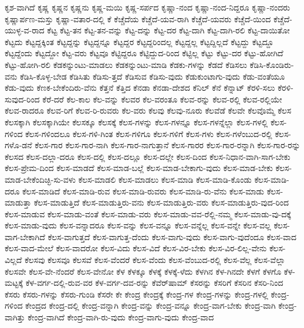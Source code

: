 {ಕೃಶ-ವಾಗಿದೆ
ಕೃಷ್ಣ
ಕೃಷ್ಣನ
ಕೃಷ್ಣನು
ಕೃಷ್ಣ-ಮಯಿ
ಕೃಷ್ಣ-ಸರ್ಪದ
ಕೃಷ್ಣಾ-ನಂದ
ಕೃಷ್ಣಾ-ನಂದ-ನಿದ್ದರೂ
ಕೃಷ್ಣಾ-ನಂದರು
ಕೃಷ್ಣಾರ್ಪಣ-ಮಸ್ತು
ಕೃಷ್ಣಾ-ವತಾರ-ದಲ್ಲಿ
ಕೆ
ಕೆಚ್ಚೆದೆಯ
ಕೆಚ್ಚೆದೆ-ಯವ-ರಾಗಿ
ಕೆಚ್ಚೆದೆ-ಯವರು
ಕೆಚ್ಚೆದೆ-ಯಿಂದ
ಕೆಚ್ಚೆದೆ-ಯುಳ್ಳ-ವ-ರಾದ
ಕೆಟ್ಟ
ಕೆಟ್ಟ-ತನ
ಕೆಟ್ಟ-ತನ-ವನ್ನು
ಕೆಟ್ಟ-ದನ್ನು
ಕೆಟ್ಟ-ದರ
ಕೆಟ್ಟ-ದಾಗಿ
ಕೆಟ್ಟ-ದಾಗಿ-ರಲಿ
ಕೆಟ್ಟ-ದಾಯಿತೋ
ಕೆಟ್ಟದು
ಕೆಟ್ಟದ್ದಕ್ಕಿಂತ
ಕೆಟ್ಟದ್ದನ್ನು
ಕೆಟ್ಟದ್ದನ್ನೂ
ಕೆಟ್ಟದ್ದರ
ಕೆಟ್ಟದ್ದರಿಂದಲ್ಲ
ಕೆಟ್ಟದ್ದಲ್ಲ
ಕೆಟ್ಟದ್ದಿಲ್ಲದೆ
ಕೆಟ್ಟದ್ದು
ಕೆಟ್ಟದ್ದೂ
ಕೆಟ್ಟದ್ದೆಂದು
ಕೆಟ್ಟದ್ದೋ
ಕೆಟ್ಟ-ವರು
ಕೆಟ್ಟವೂ
ಕೆಟ್ಟಿದ್ದರೂ
ಕೆಟ್ಟಿದ್ದುದ-ರಿಂದ
ಕೆಟ್ಟಿಲ್ಲ
ಕೆಟ್ಟು
ಕೆಟ್ಟು-ದರ
ಕೆಟ್ಟು-ಹೋಗಿದೆ
ಕೆಟ್ಟು-ಹೋಗಿ-ರಲಿ
ಕೆಡಕನ್ನುಂಟು-ಮಾಡಲು
ಕೆಡಕನ್ನುಂಟು-ಮಾಡಿ
ಕೆಡಕು-ಗಳನ್ನು
ಕೆಡದೆ
ಕೆಡಿಸಲು
ಕೆಡಿಸಿ-ಕೊಂಡಿರು-ವನು
ಕೆಡಿಸಿ-ಕೊಳ್ಳ-ಬೇಡ
ಕೆಡಿಸಿತು
ಕೆಡಿಸು-ತ್ತದೆ
ಕೆಡಿಸುವ
ಕೆಡಿಸು-ವುದು
ಕೆಡುಕುಂಟಾಗು-ವುದು
ಕೆಡು-ವಂತೆಯೂ
ಕೆಡು-ವುದು
ಕೆಣಕ-ಬೇಕೆಂದಿರು-ವೆನು
ಕೆತ್ತನೆ
ಕೆತ್ತಿದ
ಕೆನಡಾ
ಕೆನಡಾ-ದೇಶದ
ಕೆನಿಲ್
ಕೆನೆ
ಕೆನ್ನಾಟ್
ಕೆರಳಿ-ಸಲು
ಕೆರಳಿ-ಸುವುದ-ರಿಂದ
ಕೆರೆ-ದರೆ
ಕೆಲ-ಕಾಲ
ಕೆಲ-ವನ್ನು
ಕೆಲವರ
ಕೆಲ-ವರಂತೂ
ಕೆಲವ-ರನ್ನು
ಕೆಲವ-ರಲ್ಲಿ
ಕೆಲವ-ರಲ್ಲಿಯೇ
ಕೆಲವ-ರಾದರೂ
ಕೆಲವ-ರಿಗೆ
ಕೆಲವ-ರಿ-ರುವರು
ಕೆಲ-ವರು
ಕೆಲವು
ಕೆಲವು-ನೂರು
ಕೆಲವೆಡೆ
ಕೆಲವೇ
ಕೆಲವೊಮ್ಮೆ
ಕೆಲಸ
ಕೆಲಸಕ್ಕಾಗಿ
ಕೆಲಸಕ್ಕಾಗಿಯೇ
ಕೆಲಸಕ್ಕೂ
ಕೆಲಸಕ್ಕೆ
ಕೆಲಸ-ಗಳನ್ನು
ಕೆಲಸ-ಗಳನ್ನೂ
ಕೆಲಸ-ಗಳನ್ನೆಲ್ಲಾ
ಕೆಲಸ-ಗಳಲ್ಲಿ
ಕೆಲಸ-ಗಳಿಂದ
ಕೆಲಸ-ಗಳಿಂದಲೂ
ಕೆಲಸ-ಗಳಿ-ಗಿಂತ
ಕೆಲಸ-ಗಳಿಗೂ
ಕೆಲಸ-ಗಳಿಗೆ
ಕೆಲಸ-ಗಳು
ಕೆಲಸ-ಗಳೆಂಬುದ-ರಲ್ಲಿ
ಕೆಲಸ-ಗಳೊ-ಡನೆ
ಕೆಲಸ-ಗಾರ
ಕೆಲಸ-ಗಾರ-ನಾಗಿ
ಕೆಲಸ-ಗಾರ-ನಾಗುತ್ತಾನೆ
ಕೆಲಸ-ಗಾರರ
ಕೆಲಸ-ಗಾರ-ರನ್ನಾಗಿ
ಕೆಲಸ-ಗಾರ-ರನ್ನು
ಕೆಲಸದ
ಕೆಲಸ-ದಲ್ಲಾ-ದರೂ
ಕೆಲಸ-ದಲ್ಲಿ
ಕೆಲಸ-ದಲ್ಲೂ
ಕೆಲಸ-ದಲ್ಲೇ
ಕೆಲಸ-ದಿಂದ
ಕೆಲಸ-ನಿಧಾನ-ವಾಗಿ-ಸಾಗ-ಬೇಕು
ಕೆಲಸ-ಪ್ರೇಮ-ದಿಂದ
ಕೆಲಸ-ಮಾಡದೆ
ಕೆಲಸ-ಮಾಡ-ಬಲ್ಲೆ
ಕೆಲಸ-ಮಾಡ-ಬೇಕಾಗು-ವುದು
ಕೆಲಸ-ಮಾಡ-ಬೇಕು
ಕೆಲಸ-ಮಾಡ-ಬೇಕೆಂದಿಚ್ಛಿ-ಸು-ವಳು
ಕೆಲಸ-ಮಾಡಲಿ
ಕೆಲಸ-ಮಾಡಲು
ಕೆಲಸ-ಮಾಡಿ
ಕೆಲಸ-ಮಾಡಿ-ಕೊಂಡು
ಕೆಲಸ-ಮಾಡಿ-ದರೂ
ಕೆಲಸ-ಮಾಡಿದೆ
ಕೆಲಸ-ಮಾಡಿ-ರುವ
ಕೆಲಸ-ಮಾಡಿ-ರುವರು
ಕೆಲಸ-ಮಾಡಿ-ರು-ವೆನು
ಕೆಲಸ-ಮಾಡು
ಕೆಲಸ-ಮಾಡುತ್ತಾ
ಕೆಲಸ-ಮಾಡುತ್ತಿದೆ
ಕೆಲಸ-ಮಾಡುತ್ತಿರು-ವನು
ಕೆಲಸ-ಮಾಡುತ್ತಿರು-ವರು
ಕೆಲಸ-ಮಾಡುತ್ತಿರು-ವುದ-ರಿಂದ
ಕೆಲಸ-ಮಾಡುವ
ಕೆಲಸ-ಮಾಡು-ವಂತೆ
ಕೆಲಸ-ಮಾಡು-ವರು
ಕೆಲಸ-ಮಾಡು-ವವ-ರೆಲ್ಲಿ-ನಮ್ಮ
ಕೆಲಸ-ಮಾಡು-ವು-ದಕ್ಕೆ
ಕೆಲಸ-ಮಾಡು-ವುದು
ಕೆಲಸ-ವನ್ನಾದರೂ
ಕೆಲಸ-ವನ್ನು
ಕೆಲಸ-ವನ್ನೂ
ಕೆಲಸ-ವನ್ನೆಲ್ಲ
ಕೆಲಸ-ವನ್ನೇ
ಕೆಲಸ-ವಲ್ಲ
ಕೆಲಸ-ವಾಗ-ಬೇಕಾಗಿದೆ
ಕೆಲಸ-ವಾಗುತ್ತದೆ
ಕೆಲಸ-ವಾಗುತ್ತ-ದೆಂದು
ಕೆಲಸ-ವಾಗು-ವುದು
ಕೆಲಸ-ವಾಗು-ವುದೆಂದೂ
ಕೆಲಸ-ವಾದ
ಕೆಲಸ-ವಾದ-ಮೇಲೆ
ಕೆಲಸ-ವಾದರೋ
ಕೆಲಸ-ವಿದು
ಕೆಲಸ-ವಿದೆ
ಕೆಲಸ-ವಿರ-ಬೇಕು
ಕೆಲಸ-ವಿರ-ಲಿಲ್ಲ-ವೇನು
ಕೆಲಸ-ವಿಲ್ಲದೆ
ಕೆಲಸವು
ಕೆಲಸವೂ
ಕೆಲಸವೆ
ಕೆಲಸ-ವೆಂದರೆ
ಕೆಲಸ-ವೆಂದು
ಕೆಲಸ-ವೆಂಬುದ-ರಲ್ಲಿ
ಕೆಲಸ-ವೆಲ್ಲ
ಕೆಲಸ-ವೆಲ್ಲಾ
ಕೆಲಸವೇ
ಕೆಲಸ-ವೇ-ನೆಂದರೆ
ಕೆಲಸ-ವೇನೋ
ಕೆಳ
ಕೆಳಕ್ಕೂ
ಕೆಳಕ್ಕೆ
ಕೆಳಕ್ಕೆ-ಳೆದು
ಕೆಳಗಿನ
ಕೆಳ-ಗಿನದೇ
ಕೆಳಗೆ
ಕೆಳಗೊ
ಕೆಳ-ಮಟ್ಟಕ್ಕೆ
ಕೆಳ-ವರ್ಗ-ದಲ್ಲಿ-ರುವ-ವರ
ಕೆಳ-ವರ್ಗ-ದವ-ರನ್ನು
ಕೆವೆರ್‌ಷಾಮ್
ಕೆಸರನ್ನು
ಕೆಸರಿಗೆ
ಕೆಸರಿನ
ಕೆಸರಿ-ನಿಂದ
ಕೆಸರು
ಕೆಸರು-ಗಳನ್ನು
ಕೆಸರು-ಗುಂಡಿ
ಕೆಸರೇ
ಕೇ
ಕೇಂದ್ರ
ಕೇಂದ್ರಕ್ಕೆ
ಕೇಂದ್ರ-ಗಳ
ಕೇಂದ್ರ-ಗಳನ್ನು
ಕೇಂದ್ರ-ಗಳಲ್ಲಿ
ಕೇಂದ್ರ-ಗಳಿಂದ
ಕೇಂದ್ರದ
ಕೇಂದ್ರ-ದಲ್ಲಿ
ಕೇಂದ್ರ-ವನ್ನಾಗಿ
ಕೇಂದ್ರ-ವನ್ನು
ಕೇಂದ್ರ-ವನ್ನೂ
ಕೇಂದ್ರ-ವಾಗ-ಬೇಕು
ಕೇಂದ್ರ-ವಾಗಿ
ಕೇಂದ್ರ-ವಾಗಿತ್ತು
ಕೇಂದ್ರ-ವಾಗಿದೆ
ಕೇಂದ್ರ-ವಾಗಿ-ರು-ವುದು
ಕೇಂದ್ರ-ವಾಗು-ವುದು
ಕೇಂದ್ರ-ವಾದ
}
